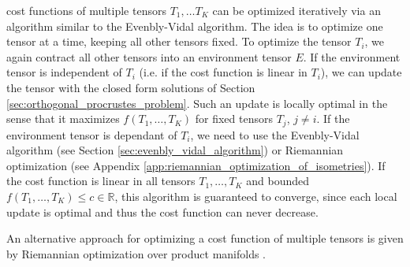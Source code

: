 cost functions of multiple tensors $T_1, \dots T_K$ can be optimized iteratively via an algorithm similar to the Evenbly-Vidal algorithm. The idea is to optimize one tensor at a time, keeping all other tensors fixed. To optimize the tensor $T_i$, we again contract all other tensors into an environment tensor $E$. If the environment tensor is independent of $T_i$ (i.e. if the cost function is linear in $T_i$), we can update the tensor with the closed form solutions of Section \ref{sec:orthogonal_procrustes_problem}. Such an update is locally optimal in the sense that it maximizes $f(T_1, \dots, T_K)$ for fixed tensors $T_j$, $j\neq i$. If the environment tensor is dependant of $T_i$, we need to use the Evenbly-Vidal algorithm (see Section \ref{sec:evenbly_vidal_algorithm}) or Riemannian optimization (see Appendix \ref{app:riemannian_optimization_of_isometries}). If the cost function is linear in all tensors $T_1, \dots, T_K$ and bounded $f(T_1, \dots, T_K) \le c\in\mathbb{R}$, this algorithm is guaranteed to converge, since each local update is optimal and thus the cost function can never decrease. \par
An alternative approach for optimizing a cost function of multiple tensors is given by Riemannian optimization over product manifolds \cite{cite:riemannian_optimization_isometric_tensor_networks}.